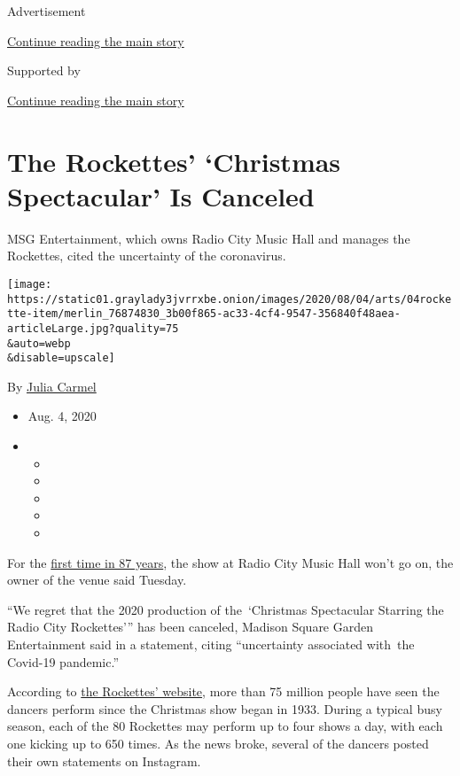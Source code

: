 Advertisement

\protect\hyperlink{after-top}{Continue reading the main story}

Supported by

\protect\hyperlink{after-sponsor}{Continue reading the main story}

\hypertarget{the-rockettes-christmas-spectacular-is-canceled}{%
\section{The Rockettes' `Christmas Spectacular' Is
Canceled}\label{the-rockettes-christmas-spectacular-is-canceled}}

MSG Entertainment, which owns Radio City Music Hall and manages the
Rockettes, cited the uncertainty of the coronavirus.

\texttt{[image: https://static01.graylady3jvrrxbe.onion/images/2020/08/04/arts/04rockette-item/merlin\_76874830\_3b00f865-ac33-4cf4-9547-356840f48aea-articleLarge.jpg?quality=75\\\&auto=webp\\\&disable=upscale]}

By \href{https://www.nytimes3xbfgragh.onion/by/julia-carmel}{Julia
Carmel}

\begin{itemize}
\item
  Aug. 4, 2020
\item
  \begin{itemize}
  \item
  \item
  \item
  \item
  \item
  \end{itemize}
\end{itemize}

For the
\href{https://www.rockettes.com/blog/fun-facts-about-the-radio-city-christmas-spectacular-and-the-rockettes/}{first
time in 87 years}, the show at Radio City Music Hall won't go on, the
owner of the venue said Tuesday.

``We regret that the 2020 production of the~`Christmas Spectacular
Starring the Radio City Rockettes''' has been canceled, Madison Square
Garden Entertainment said in a statement, citing ``uncertainty
associated with~the Covid-19 pandemic.''

According to \href{https://www.rockettes.com/blog/}{the Rockettes'
website}, more than 75 million people have seen the dancers perform
since the Christmas show began in 1933. During a typical busy season,
each of the 80 Rockettes may perform up to four shows a day, with each
one kicking up to 650 times. As the news broke, several of the dancers
posted their own statements on Instagram.

